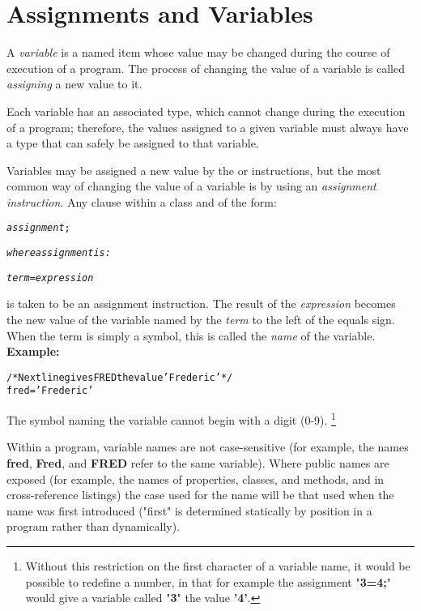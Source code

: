 \chapter{Assignments and Variables}\label{refassign}
\index{,}
 A \emph{variable} is a named item whose value may be changed
during the course of execution of a \nr{} program.
The process of changing the value of a variable is called
\emph{assigning} a new value to it.
 
Each variable has an associated type, which cannot change during the
execution of a program; therefore, the values assigned to a given
variable must always have a type that can safely be assigned to that
variable.

Variables may be assigned a new value by the  or
 instructions, but the most common way of changing the
value of a variable is by using an \emph{assignment instruction}.
Any clause within a class and of the form:
\begin{shaded}
\begin{alltt}
\emph{assignment};

\emph{where \emph{assignment} is:}

\emph{term}=\emph{expression}
\end{alltt}
\end{shaded}
is taken to be an assignment instruction.
The result of the \emph{expression} becomes the new value of the
variable named by the \emph{term} to the left of the equals sign.
When the term is simply a symbol, this is called the \emph{name} of
the variable.
 \textbf{Example:}
\begin{alltt}
/* Next line gives FRED the value 'Frederic' */
fred='Frederic'
\end{alltt}
The symbol naming the variable cannot begin with a digit (0-9).
\footnote{
Without this restriction on the first character of a variable name,
it would be possible to redefine a number, in that for example the
assignment "\textbf{3=4;}" would give a variable called
"\textbf{3}" the value \textbf{'4'}.
}
 
Within a \nr{} program, variable names are not case-sensitive (for
example, the names \textbf{fred}, \textbf{Fred}, and \textbf{FRED}
refer to the same variable).
Where public names are exposed (for example, the names of properties,
classes, and methods, and in cross-reference listings) the case used for
the name will be that used when the name was first introduced
("first" is determined statically by position in a program rather
than dynamically).
 
